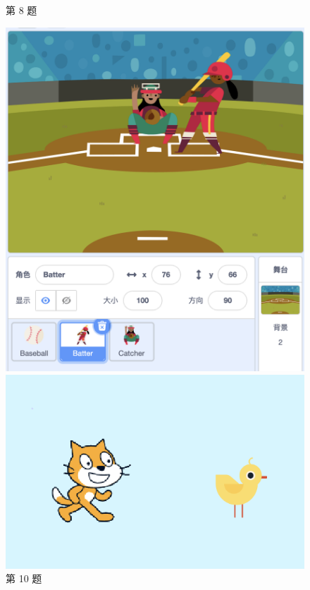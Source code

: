 \documentclass[10pt, a4paper]{article}
\begin{document}
\begin{enumerate}
\begin{figure}[htbp]
\begin{minipage}[t]{.16\textwidth}
                \caption*{第 8 题}
            \end{minipage}
            \begin{minipage}[t]{.15\textwidth}
                \centering
                \includegraphics[width=\textwidth]{figure/10.png}
                \caption*{第 10 题}
            \end{minipage}
            \begin{minipage}[t]{.45\textwidth}
                \centering
                \begin{minipage}[t]{.43\textwidth}
                    \centering
                    \includegraphics[width=\textwidth]{figure/11-1.png}

\end{minipage}
\end{minipage}
\end{figure}
\end{enumerate}
\end{document}
